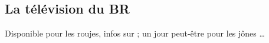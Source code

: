 
\subsection{La t\'el\'evision du BR}
\label{TV}

Disponible pour les roujes, infos sur  ; un jour peut-\^etre pour les j\^ones \dots







